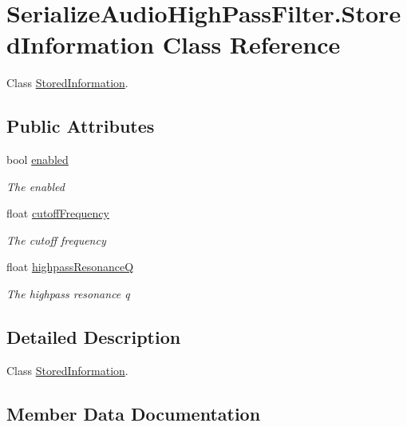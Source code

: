 \hypertarget{class_serialize_audio_high_pass_filter_1_1_stored_information}{}\section{Serialize\+Audio\+High\+Pass\+Filter.\+Stored\+Information Class Reference}
\label{class_serialize_audio_high_pass_filter_1_1_stored_information}


Class \hyperlink{class_serialize_audio_high_pass_filter_1_1_stored_information}{Stored\+Information}.  


\subsection*{Public Attributes}
\begin{DoxyCompactItemize}
\item 
bool \hyperlink{class_serialize_audio_high_pass_filter_1_1_stored_information_ada3d4428d4a6bfe685c7142dbb11d539}{enabled}
\begin{DoxyCompactList}\small\item\em The enabled \end{DoxyCompactList}\item 
float \hyperlink{class_serialize_audio_high_pass_filter_1_1_stored_information_aecd4ab2cf0d5a9fe067f5b3cb1c5dd60}{cutoff\+Frequency}
\begin{DoxyCompactList}\small\item\em The cutoff frequency \end{DoxyCompactList}\item 
float \hyperlink{class_serialize_audio_high_pass_filter_1_1_stored_information_ac134dd438a45168c0e61f7a27285d2e7}{highpass\+ResonanceQ}
\begin{DoxyCompactList}\small\item\em The highpass resonance q \end{DoxyCompactList}\end{DoxyCompactItemize}


\subsection{Detailed Description}
Class \hyperlink{class_serialize_audio_high_pass_filter_1_1_stored_information}{Stored\+Information}. 



\subsection{Member Data Documentation}
\mbox{\label{class_serialize_audio_high_pass_filter_1_1_stored_information_aecd4ab2cf0d5a9fe067f5b3cb1c5dd60}} 

